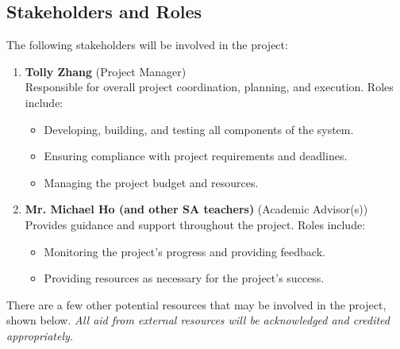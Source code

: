 \documentclass[12pt]{article}
\begin{document}
\subsection{Stakeholders and Roles}
The following stakeholders will be involved in the project:
\begin{enumerate}
    \item \textbf{Tolly Zhang} (Project Manager) \\
    Responsible for overall project coordination, planning, and execution. Roles include:
    \begin{itemize}
        \item Developing, building, and testing all components of the system.
        \item Ensuring compliance with project requirements and deadlines.
        \item Managing the project budget and resources.
    \end{itemize}
    \item \textbf{Mr. Michael Ho (and other SA teachers)} (Academic Advisor(s)) \\
    Provides guidance and support throughout the project. Roles include:
    \begin{itemize}
        \item Monitoring the project's progress and providing feedback.
        \item Providing resources as necessary for the project's success.
    \end{itemize}
\end{enumerate}
There are a few other potential resources that may be involved in the project, shown below.
\textit{All aid from external resources will be acknowledged and credited appropriately.}
\end{document}
